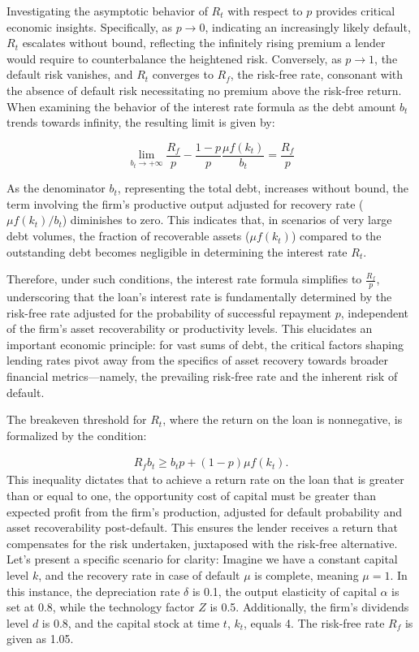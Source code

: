 \documentclass[12pt]{report}
\begin{document}
Investigating the asymptotic behavior of \( R_t \) with respect to \( p \) provides critical economic insights.
Specifically, as \( p \rightarrow 0 \), indicating an increasingly likely default, \( R_t \) escalates without bound,
reflecting the infinitely rising premium a lender would require to counterbalance the heightened risk. Conversely, as \(
p \rightarrow 1 \), the default risk vanishes, and \( R_t \) converges to \( R_f \), the risk-free rate, consonant with
the absence of default risk necessitating no premium above the risk-free return. 
When examining the behavior of the interest rate formula as the debt amount \(b_t\) trends towards infinity, the resulting limit is given by:

\[
\lim_{{b_t \rightarrow +\infty}} \frac{R_f}{p} - \frac{1-p}{p}\frac{\mu f(k_t)}{b_t} = \frac{R_f}{p}
\]

As the denominator \(b_t\), representing the total
debt, increases without bound, the term involving the firm's productive output adjusted for recovery rate (\(\mu
f(k_t)/b_t\)) diminishes to zero. This indicates that, in scenarios of very large debt volumes, the fraction of
recoverable assets (\(\mu f(k_t)\)) compared to the outstanding debt becomes negligible in determining the interest rate
\(R_t\).

Therefore, under such conditions, the interest rate formula simplifies to \(\frac{R_f}{p}\), underscoring that the
loan's interest rate is fundamentally determined by the risk-free rate adjusted for the probability of successful
repayment \(p\), independent of the firm's asset recoverability or productivity levels. This elucidates an important
economic principle: for vast sums of debt, the critical factors shaping lending rates pivot away from the specifics of
asset recovery towards broader financial metrics—namely, the prevailing risk-free rate and the inherent risk of default.



The breakeven threshold for \( R_t \), where the return on the loan is nonnegative, is formalized by the condition:

\begin{align}
    R_f b_t \geq b_t  p +(1-p) \mu  f(k_t). 
\end{align}
This inequality dictates that to achieve a return rate on the loan that is greater than or equal to one, the opportunity
cost of capital must be greater than expected profit from the firm's production, adjusted for default probability and asset
recoverability post-default. This ensures the lender receives a return that compensates for the risk undertaken,
juxtaposed with the risk-free alternative.
Let's present a specific scenario for clarity: Imagine we have a constant capital level \(k\), and the recovery rate in
case of default \(\mu\) is complete, meaning \(\mu=1\). In this instance, the depreciation rate \(\delta\) is 0.1, the
output elasticity of capital \(\alpha\) is set at 0.8, while the technology factor \(Z\) is 0.5. Additionally, the
firm's dividends level \(d\) is 0.8, and the capital stock at time \(t\), \(k_t\), equals 4. The risk-free rate \(R_f\) is given as
1.05.
\end{document}
